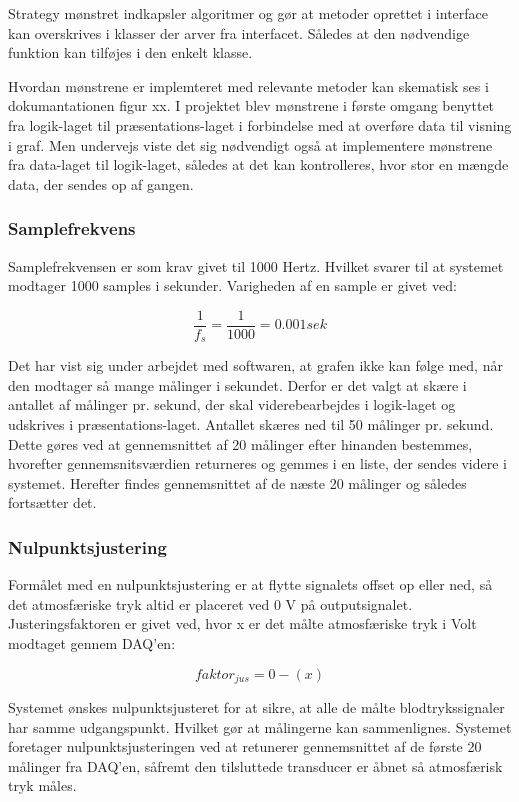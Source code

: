 Strategy mønstret indkapsler algoritmer og gør at metoder oprettet i interface kan overskrives i klasser der arver fra interfacet. Således at den nødvendige funktion kan tilføjes i den enkelt klasse.

Hvordan mønstrene er implemteret med relevante metoder kan skematisk ses i dokumantationen figur xx. I projektet blev mønstrene i første omgang benyttet fra logik-laget til præsentations-laget i forbindelse med at overføre data til visning i graf. Men undervejs viste det sig nødvendigt også at implementere mønstrene fra data-laget til logik-laget, således at det kan kontrolleres, hvor stor en mængde data, der sendes op af gangen. 

\subsubsection{Samplefrekvens}
Samplefrekvensen er som krav givet til 1000 Hertz. Hvilket svarer til at systemet modtager 1000 samples i sekunder. Varigheden af en sample er givet ved: 
\begin{ceqn}
\begin{equation}
\frac{1}{f_s}=\frac{1}{1000}=0.001 sek
\end{equation}
\end{ceqn}
Det har vist sig under arbejdet med softwaren, at grafen ikke kan følge med, når den modtager så mange målinger i sekundet. Derfor er det valgt at skære i antallet af målinger pr. sekund, der skal viderebearbejdes i logik-laget og udskrives i præsentations-laget. Antallet skæres ned til 50 målinger pr. sekund. Dette gøres ved at gennemsnittet af 20 målinger efter hinanden bestemmes, hvorefter gennemsnitsværdien returneres og gemmes i en liste, der sendes videre i systemet. Herefter findes gennemsnittet af de næste 20 målinger og således fortsætter det. 

\subsubsection{Nulpunktsjustering}
Formålet med en nulpunktsjustering er at flytte signalets offset op eller ned, så det atmosfæriske tryk altid er placeret ved 0 V på outputsignalet. Justeringsfaktoren er givet ved, hvor x er det målte atmosfæriske tryk i Volt modtaget gennem DAQ'en:
\begin{ceqn}
\begin{equation}
faktor_{jus}=0-(x)
\end{equation}
\end{ceqn}
Systemet ønskes nulpunktsjusteret for at sikre, at alle de målte blodtrykssignaler har samme udgangspunkt. Hvilket gør at målingerne kan sammenlignes. Systemet foretager nulpunktsjusteringen ved at retunerer gennemsnittet af de første 20 målinger fra DAQ'en, såfremt den tilsluttede transducer er åbnet så atmosfærisk tryk måles.  


